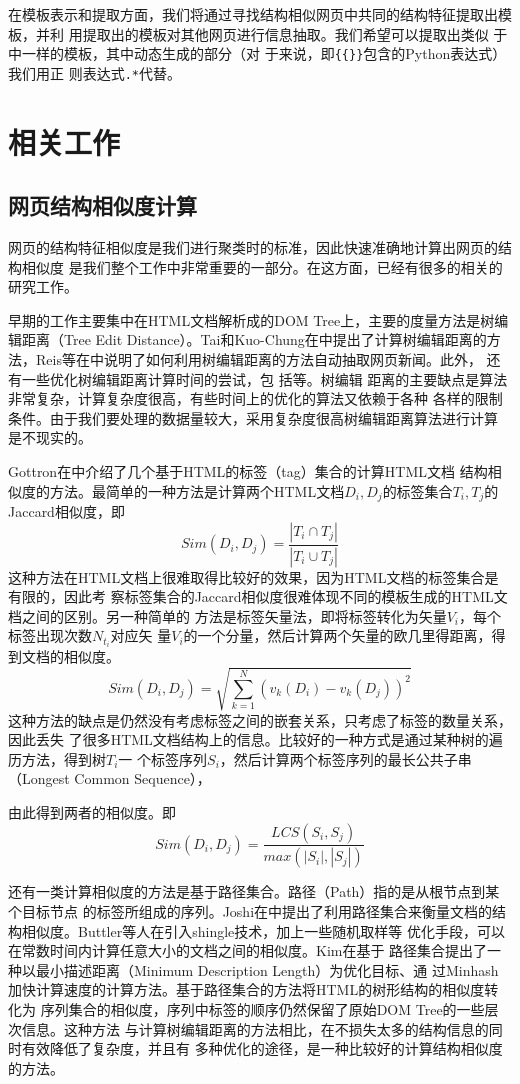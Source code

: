 在模板表示和提取方面，我们将通过寻找结构相似网页中共同的结构特征提取出模板，并利
用提取出的模板对其他网页进行信息抽取。我们希望可以提取出类似
于中一样的模板，其中动态生成的部分（对
于来说，即\texttt{\{\{\}\}}包含的Python表达式）我们用正
则表达式\texttt{.*}代替。
\section{相关工作}
\label{sec:relatedwork}

\subsection{网页结构相似度计算}
\label{sec:relatedwork:sim}
网页的结构特征相似度是我们进行聚类时的标准，因此快速准确地计算出网页的结构相似度
是我们整个工作中非常重要的一部分。在这方面，已经有很多的相关的研究工作。

早期的工作主要集中在HTML文档解析成的DOM Tree上，主要的度量方法是树编辑距离（Tree
Edit Distance）。Tai和Kuo-Chung在\cite{tai1979tree}中提出了计算树编辑距离的方
法，Reis等在\cite{reisauto}中说明了如何利用树编辑距离的方法自动抽取网页新闻。此外，
还有一些优化树编辑距离计算时间的尝试，包
括\cite{zhang1989simple}\cite{dubiner1994faster}\cite{touzet2005linear}等。树编辑
距离的主要缺点是算法非常复杂，计算复杂度很高，有些时间上的优化的算法又依赖于各种
各样的限制条件。由于我们要处理的数据量较大，采用复杂度很高树编辑距离算法进行计算
是不现实的。

Gottron在\cite{GottronCluster}中介绍了几个基于HTML的标签（tag）集合的计算HTML文档
结构相似度的方法。最简单的一种方法是计算两个HTML文档$D_i,D_{j}$的标签集合$T_i,
T_j$的Jaccard相似度，即
\[
Sim(D_i,D_j)=\frac{|T_i \cap T_j|}{|T_i \cup T_j|}
\]
这种方法在HTML文档上很难取得比较好的效果，因为HTML文档的标签集合是有限的，因此考
察标签集合的Jaccard相似度很难体现不同的模板生成的HTML文档之间的区别。另一种简单的
方法是标签矢量法，即将标签转化为矢量$V_i$，每个标签出现次数$N_{t_i}$对应矢
量$V_i$的一个分量，然后计算两个矢量的欧几里得距离，得到文档的相似度。
\[
Sim(D_i,D_j)=\sqrt{\sum_{k=1}^N(v_k(D_i)-v_k(D_j))^2}
\]
这种方法的缺点是仍然没有考虑标签之间的嵌套关系，只考虑了标签的数量关系，因此丢失
了很多HTML文档结构上的信息。比较好的一种方式是通过某种树的遍历方法，得到树$T_i$一
个标签序列$S_i$，然后计算两个标签序列的最长公共子串（Longest Common Sequence），

由此得到两者的相似度。即
\[
Sim(D_i,D_j)=\frac{LCS(S_i,S_j)}{max(|S_i|,|S_j|)}
\]

还有一类计算相似度的方法是基于路径集合。路径（Path）指的是从根节点到某个目标节点
的标签所组成的序列。Joshi在\cite{joshi2003bag}中提出了利用路径集合来衡量文档的结
构相似度。Buttler等人在\cite{buttler2004short}引入shingle技术，加上一些随机取样等
优化手段，可以在常数时间内计算任意大小的文档之间的相似度。Kim在\cite{KimText}基于
路径集合提出了一种以最小描述距离（Minimum Description Length）为优化目标、通
过Minhash加快计算速度的计算方法。基于路径集合的方法将HTML的树形结构的相似度转化为
序列集合的相似度，序列中标签的顺序仍然保留了原始DOM Tree的一些层次信息。这种方法
与计算树编辑距离的方法相比，在不损失太多的结构信息的同时有效降低了复杂度，并且有
多种优化的途径，是一种比较好的计算结构相似度的方法。


